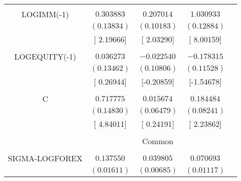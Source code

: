 \begin{tabular}{lrrrr}
\multicolumn{1}{c}{}&\multicolumn{1}{c}{}&\multicolumn{1}{c}{}&\multicolumn{1}{c}{}&\multicolumn{1}{c}{}\\
\multicolumn{1}{c}{LOGIMM(-1)}&\multicolumn{1}{c}{$0.303883$}&\multicolumn{1}{c}{$0.207014$}&\multicolumn{1}{c}{$1.030933$}&\multicolumn{1}{c}{}\\
\multicolumn{1}{c}{}&\multicolumn{1}{c}{$(0.13834)$}&\multicolumn{1}{c}{$(0.10183)$}&\multicolumn{1}{c}{$(0.12884)$}&\multicolumn{1}{c}{}\\
\multicolumn{1}{c}{}&\multicolumn{1}{c}{[ 2.19666]}&\multicolumn{1}{c}{[ 2.03290]}&\multicolumn{1}{c}{[ 8.00159]}&\multicolumn{1}{c}{}\\
\multicolumn{1}{c}{}&\multicolumn{1}{c}{}&\multicolumn{1}{c}{}&\multicolumn{1}{c}{}&\multicolumn{1}{c}{}\\
\multicolumn{1}{c}{LOGEQUITY(-1)}&\multicolumn{1}{c}{$0.036273$}&\multicolumn{1}{c}{$-0.022540$}&\multicolumn{1}{c}{$-0.178315$}&\multicolumn{1}{c}{}\\
\multicolumn{1}{c}{}&\multicolumn{1}{c}{$(0.13462)$}&\multicolumn{1}{c}{$(0.10806)$}&\multicolumn{1}{c}{$(0.11528)$}&\multicolumn{1}{c}{}\\
\multicolumn{1}{c}{}&\multicolumn{1}{c}{[ 0.26944]}&\multicolumn{1}{c}{[-0.20859]}&\multicolumn{1}{c}{[-1.54678]}&\multicolumn{1}{c}{}\\
\multicolumn{1}{c}{}&\multicolumn{1}{c}{}&\multicolumn{1}{c}{}&\multicolumn{1}{c}{}&\multicolumn{1}{c}{}\\
\multicolumn{1}{c}{C}&\multicolumn{1}{c}{$0.717775$}&\multicolumn{1}{c}{$0.015674$}&\multicolumn{1}{c}{$0.184484$}&\multicolumn{1}{c}{}\\
\multicolumn{1}{c}{}&\multicolumn{1}{c}{$(0.14830)$}&\multicolumn{1}{c}{$(0.06479)$}&\multicolumn{1}{c}{$(0.08241)$}&\multicolumn{1}{c}{}\\
\multicolumn{1}{c}{}&\multicolumn{1}{c}{[ 4.84011]}&\multicolumn{1}{c}{[ 0.24191]}&\multicolumn{1}{c}{[ 2.23862]}&\multicolumn{1}{c}{}\\
[4.5pt] \hline \\ [-4.5pt]
\multicolumn{1}{c}{}&\multicolumn{3}{c}{Common}&\multicolumn{1}{c}{}\\
[4.5pt] \hline \\ [-4.5pt]
\multicolumn{1}{c}{SIGMA-LOGFOREX}&\multicolumn{1}{c}{$0.137550$}&\multicolumn{1}{c}{$0.039805$}&\multicolumn{1}{c}{$0.070693$}&\multicolumn{1}{c}{}\\
\multicolumn{1}{c}{}&\multicolumn{1}{c}{$(0.01611)$}&\multicolumn{1}{c}{$(0.00685)$}&\multicolumn{1}{c}{$(0.01117)$}&\multicolumn{1}{c}{}\\

\end{tabular}
